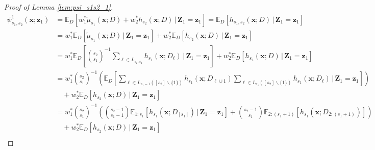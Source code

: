 \documentclass[letterpaper,10pt]{article}
\numberwithin{equation}{section}
\numberwithin{thm}{section}
\numberwithin{lem}{section}
\numberwithin{cor}{section}
\newcommand{\E}{\mathbb{E}}
\newcommand{\1}{\mathbbm{1}}
\begin{document}
\begin{proof}[Proof of Lemma \ref{lem:psi_s1s2_1}]
	\begin{equation}
		\begin{aligned}
			\psi_{s_1, s_2}^{1}\left(\mathbf{x}; \mathbf{z}_1\right)
			 & = \E_{D}\left[w_{1}^{*} \tilde{\mu}_{s_1}\left(\mathbf{x}; D\right)
				+ w_{2}^{*} h_{s_2}\left(\mathbf{x}; D\right)\, | \, \mathbf{Z}_1 = \mathbf{z}_1\right]
			= \E_{D}\left[h_{s_1, s_2}\left(\mathbf{x}; D\right) \, | \, \mathbf{Z}_1 = \mathbf{z}_1 \right]                                                             \\
			 & = w_{1}^{*} \E_{D}\left[\tilde{\mu}_{s_1}\left(\mathbf{x}; D\right)\, | \, \mathbf{Z}_1 = \mathbf{z}_1\right]
			+ w_{2}^{*} \E_D\left[h_{s_2}\left(\mathbf{x}; D\right)\, | \, \mathbf{Z}_1 = \mathbf{z}_1\right]                                                            \\
			 & = w_{1}^{*} \E_{D}\left[\binom{s_2}{s_1}^{-1}\sum_{\ell \in L_{s_2, s_1}}h_{s_1}\left(\mathbf{x}; D_\ell\right)\, | \, \mathbf{Z}_1 = \mathbf{z}_1\right]
			+ w_{2}^{*} \E_D\left[h_{s_2}\left(\mathbf{x}; D\right)\, | \, \mathbf{Z}_1 = \mathbf{z}_1\right]                                                            \\
			 & = w_{1}^{*} \binom{s_2}{s_1}^{-1}\left(\E_{D}\left[
				\sum_{\ell \in L_{s_1 - 1}\left([s_2]\backslash \{1\}\right)}h_{s_1}\left(\mathbf{x}; D_{\ell \cup 1}\right)
				\sum_{\ell \in L_{s_1}\left([s_2]\backslash \{1\}\right)}h_{s_1}\left(\mathbf{x}; D_\ell\right)
				\, | \, \mathbf{Z}_1 = \mathbf{z}_1\right]
			\right)                                                                                                                                                      \\
			 & \quad + w_{2}^{*} \E_D\left[h_{s_2}\left(\mathbf{x}; D\right)\, | \, \mathbf{Z}_1 = \mathbf{z}_1\right]                                                   \\
			 & = w_{1}^{*} \binom{s_2}{s_1}^{-1}\left(
			\binom{s_2-1}{s_1-1}\E_{1:s_1}\left[h_{s_1}\left(\mathbf{x}; D_{[s_1]}\right) \, | \, \mathbf{Z}_1 = \mathbf{z}_1 \right]
			+ \binom{s_2-1}{s_1}\E_{2:(s_1+1)}\left[h_{s_1}\left(\mathbf{x}; D_{2:(s_1+1)}\right)\right]
			\right)                                                                                                                                                      \\
			 & \quad + w_{2}^{*} \E_D\left[h_{s_2}\left(\mathbf{x}; D\right)\, | \, \mathbf{Z}_1 = \mathbf{z}_1\right]                                                   \\

\end{aligned}
\end{equation}
\end{proof}
\end{document}

